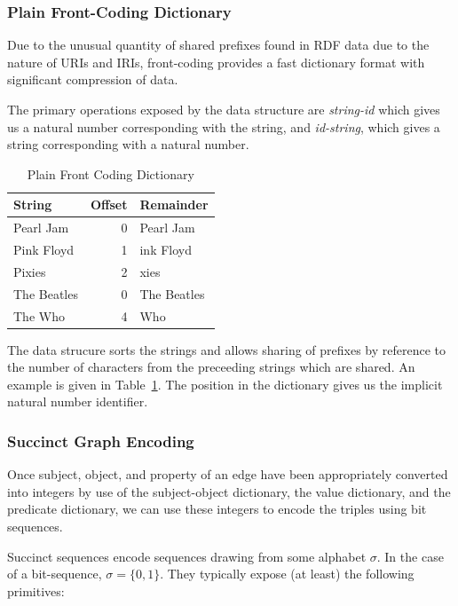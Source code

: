 \documentclass[10pt, a4paper, twocolumn]{article} %
\begin{document}
\subsubsection{Plain Front-Coding Dictionary}

Due to the unusual quantity of shared prefixes found in RDF data due
to the nature of URIs and IRIs, front-coding provides a fast
dictionary format with significant compression of
data\autocite{MARTINEZPRIETO201673}.

The primary operations exposed by the data structure are {\em
  string-id} which gives us a natural number corresponding with the
string, and {\em id-string}, which gives a string corresponding with a
natural number.

\begin{table}
	\centering
	\begin{tabular}{l|rl}
		\toprule
		String & Offset & Remainder \\
		\midrule
        Pearl Jam & 0 & Pearl Jam \\
        Pink Floyd & 1 & ink Floyd \\
        Pixies & 2 & xies \\
		The Beatles & 0 & The Beatles \\
		The Who & 4 & Who \\
		\bottomrule
	\end{tabular}
    \caption{Plain Front Coding Dictionary}
    \label{tab:pfc}
\end{table}

The data strucure sorts the strings and allows sharing of prefixes by
reference to the number of characters from the preceeding strings
which are shared. An example is given in Table~\ref{tab:pfc}. The
position in the dictionary gives us the implicit natural number
identifier.

\subsubsection{Succinct Graph Encoding}

Once subject, object, and property of an edge have been appropriately
converted into integers by use of the subject-object dictionary, the
value dictionary, and the predicate dictionary, we can use these
integers to encode the triples using bit sequences.

Succinct sequences encode sequences drawing from some alphabet
\(\sigma\). In the case of a bit-sequence, \(\sigma=\{0,1\}\). They
typically expose (at least) the following primitives:
\end{document}
